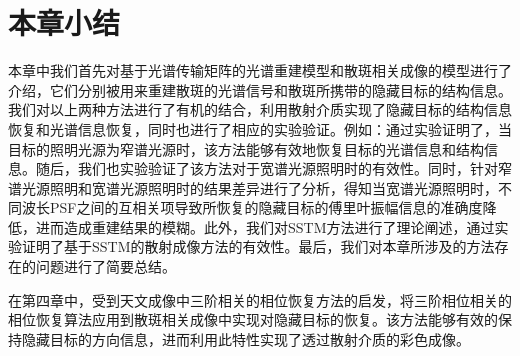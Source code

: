 \section{本章小结}

本章中我们首先对基于光谱传输矩阵的光谱重建模型和散斑相关成像的模型进行了介绍，它们分别被用来重建散斑的光谱信号和散斑所携带的隐藏目标的结构信息。我们对以上两种方法进行了有机的结合，利用散射介质实现了隐藏目标的结构信息恢复和光谱信息恢复，同时也进行了相应的实验验证。例如：通过实验证明了，当目标的照明光源为窄谱光源时，该方法能够有效地恢复目标的光谱信息和结构信息。随后，我们也实验验证了该方法对于宽谱光源照明时的有效性。同时，针对窄谱光源照明和宽谱光源照明时的结果差异进行了分析，得知当宽谱光源照明时，不同波长PSF之间的互相关项导致所恢复的隐藏目标的傅里叶振幅信息的准确度降低，进而造成重建结果的模糊。此外，我们对SSTM方法进行了理论阐述，通过实验证明了基于SSTM的散射成像方法的有效性。最后，我们对本章所涉及的方法存在的问题进行了简要总结。

在第四章中，受到天文成像中三阶相关的相位恢复方法的启发，将三阶相位相关的相位恢复算法应用到散斑相关成像中实现对隐藏目标的恢复。该方法能够有效的保持隐藏目标的方向信息，进而利用此特性实现了透过散射介质的彩色成像。
